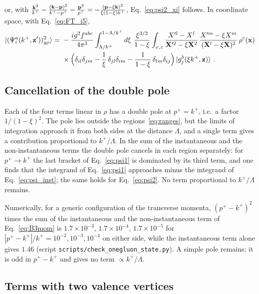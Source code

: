 or, with $\frac{\mathbf{k}^2}{k^+}-\frac{(\mathbf{k}-\mathbf{p})^2}{k^+-p^+}-\frac{\mathbf{p}^2}{p^+}=-\frac{(\mathbf{p}-\xi\mathbf{k})^2}{\xi(1-\xi)k^+}$,
Eq.~\eqref{eq:psi2_xi} follows. In coordinate space, with Eq.~\eqref{eq:FT_i5},
\begin{align}\label{eq:psi2X}
\ket{(\Psi^a_i(k^+,\v z'))^2_{g\rho}}=\ &-\frac{ig^2f^{abc}}{4\pi^3}\int_{\Lambda/k^+}^{1-\Lambda/k^+}d\xi\ \frac{\xi^{3/2}}{1-\xi}\int_{x,z}\frac{X'^l-X^l}{\v X'^2-\xi\v X^2}\,\frac{X'^m-\xi X^m}{(\v X'-\xi\v X)^2}\,\rho^c(\v x)\notag\\
&\times\Big(\delta_{il}\delta_{jm}-\frac1\xi\,\delta_{jl}\delta_{im}-\frac{1}{1-\xi}\,\delta_{lm}\delta_{ij}\Big)\ket{g^b_j(\xi k^+,\v z)}\,.
\end{align}

\subsection{Cancellation of the double pole}\label{app:doublepole}

Each of the four terms linear in $\rho$ has a double pole at $p^+=k^+$, i.e.\ a factor $1/(1-\xi)^2$. The pole lies outside the regions~\eqref{eq:ranges}, but the limits of integration approach it from both sides at the distance $\Lambda$, and a single term gives a contribution proportional to $k^+/\Lambda$. In the sum of the instantaneous and the non-instantaneous terms the double pole cancels in each region separately: for $p^+\to k^+$ the last bracket of Eq.~\eqref{eq:psi1} is dominated by its third term, and one finds that the integrand of Eq.~\eqref{eq:psi1} approaches minus the integrand of Eq.~\eqref{eq:psi_inst}; the same holds for Eq.~\eqref{eq:psi2}. No term proportional to $k^+/\Lambda$ remains.

Numerically, for a generic configuration of the transverse momenta, $(p^+-k^+)^2$ times the sum of the instantaneous and the non-instantaneous term of Eq.~\eqref{eq:B3mom} is $1.7\times10^{-3}$, $1.7\times10^{-4}$, $1.7\times10^{-5}$ for $|p^+-k^+|/k^+=10^{-2},10^{-3},10^{-4}$ on either side, while the instantaneous term alone gives $1.46$ (script \texttt{scripts/check\_onegluon\_state.py}). A simple pole remains; it is odd in $p^+-k^+$ and gives no term $\propto k^+/\Lambda$.

\subsection{Terms with two valence vertices}\label{app:tworho}

